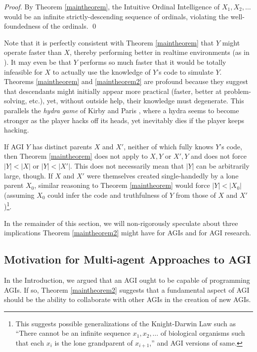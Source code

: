 \documentclass[runningheads]{llncs}
\begin{document}
\begin{proof}
By Theorem \ref{maintheorem}, the Intuitive Ordinal Intelligence of $X_1,X_2,\ldots$
would be an infinite strictly-descending sequence of ordinals, violating
the well-foundedness of the ordinals.
\qed
\end{proof}

Note that it is perfectly consistent with
Theorem \ref{maintheorem} that $Y$ might operate faster
than $X$, thereby performing better in realtime environments (as in \cite{gavane}).
It may even be that $Y$ performs so much faster that it would be totally infeasible for
$X$ to actually use the knowledge of $Y$'s code to simulate $Y$.
Theorems \ref{maintheorem} and \ref{maintheorem2} are profound because
they suggest that descendants might initially appear more practical
(faster, better at problem-solving, etc.),
yet, without outside help, their knowledge must degenerate.
This parallels the \emph{hydra game} of
Kirby and Paris \cite{kirby1982accessible}, where a hydra
seems to become stronger as the player hacks off its heads, yet
inevitably dies if the player keeps hacking.

If AGI $Y$ has distinct parents $X$ and $X'$, neither of which fully knows
$Y$'s code, then Theorem \ref{maintheorem} does not apply to $X,Y$ or $X',Y$ and
does not force
$|Y|<|X|$ or $|Y|<|X'|$. This does not necessarily mean that
$|Y|$ can be arbitrarily large, though. If $X$ and $X'$ were themselves
created single-handedly by a lone parent $X_0$, similar
reasoning to Theorem \ref{maintheorem} would force $|Y|<|X_0|$ (assuming $X_0$
could infer the code and truthfulness of $Y$ from those of $X$ and $X'$)\footnote{This
suggests possible generalizations of the Knight-Darwin Law such as ``There cannot be
an infinite sequence $x_1,x_2,\ldots$ of biological organisms such that each $x_i$
is the lone grandparent of $x_{i+1}$,'' and AGI versions of same.}.

In the remainder of this section, we will non-rigorously speculate about three implications
Theorem \ref{maintheorem2} might have for AGIs and for AGI research.


\subsection{Motivation for Multi-agent Approaches to AGI}

In the Introduction, we argued that an AGI ought to be
capable of programming AGIs. If so, Theorem \ref{maintheorem2} suggests
that a fundamental aspect of AGI should be the ability to collaborate with other
AGIs in the creation of new AGIs.
\end{document}
